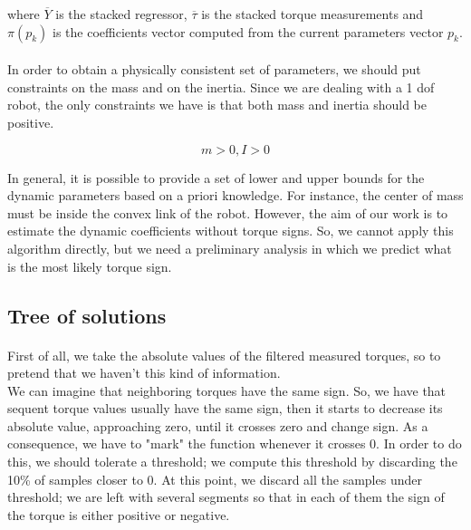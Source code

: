 \documentclass{article}
\begin{document}
\noindent where $\overline{Y}$ is the stacked regressor, $\overline{\tau}$ is the stacked  torque measurements and $\pi(p_k)$ is the coefficients vector computed from the current parameters vector $p_k$.

\paragraph{}In order to obtain a physically consistent set of parameters, we should put constraints on the mass and on the inertia. Since we are dealing with a 1 dof robot, the only constraints we have is that both mass and inertia should be positive.

\[m > 0, I > 0\]

In general, it is possible to provide a set of lower and upper bounds for the dynamic parameters based on a priori knowledge. For instance, the center of mass must be inside the convex link of the robot. However, the aim of our work is to estimate the dynamic coefficients without torque signs. So, we cannot apply this algorithm directly, but we need a preliminary analysis in which we predict what is the most likely torque sign.

\subsection{Tree of solutions}
\paragraph{}First of all, we take the absolute values of the filtered measured torques, so to pretend that we haven't this kind of information.\\
We can imagine that neighboring torques have the same sign. So, we have that sequent torque values usually have the same sign, then it starts to decrease its absolute value, approaching zero, until it crosses zero and change sign. As a consequence, we have to "mark" the function whenever it crosses 0. In order to do this, we should tolerate a threshold; we compute this threshold by discarding the 10\% of samples closer to 0. At this point, we discard all the samples under threshold; we are left with several segments so that in each of them the sign of the torque is either positive or negative.
\end{document}
